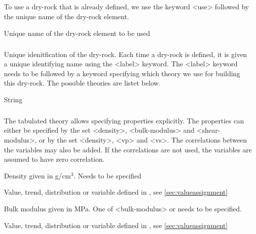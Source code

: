 {\subparagraph{}
 \slist
   \item \Description  To use a dry-rock that is already defined, we use the keyword <use> followed by the unique name of the dry-rock element.
   \item \Argument Unique name of the dry-rock element to be used
   \item \Default 
 \elist

\subparagraph{}
 \slist
   \item \Description Unique idenitfication of the dry-rock. Each time a dry-rock is defined, it is given a unique identifying name using
the <label> keyword. The <label> keyword needs to be followed by a keyword specifying which theory we use for building this dry-rock. The possible theories are listet below. 
   \item \Argument String
   \item \Default 
 \elist

\subparagraph{}
 \slist
   \item \Description The tabulated theory allows specifying properties explicitly. The properties can either be specified by the set <density>, <bulk-modulus> and <shear-modulus>, or by the set <density>, <vp> and <vs>. The correlations between the variables may also be added. If the correlations are not used, the variables are assumed to have zero correlation. 
   \item \Argument
   \item \Default 
 \elist

 \slist
   \item \Description Density given in g/cm$^3$. Needs to be specified
   \item \Argument Value, trend, distribution or variable defined in , see \autoref{sec:valueassignment}
   \item \Default 
 \elist

 \slist
   \item \Description Bulk modulus given in MPa. One of <bulk-modulus> or  needs to be specified.
   \item \Argument Value, trend, distribution or variable defined in , see \autoref{sec:valueassignment}
   \item \Default 
 \elist

}
